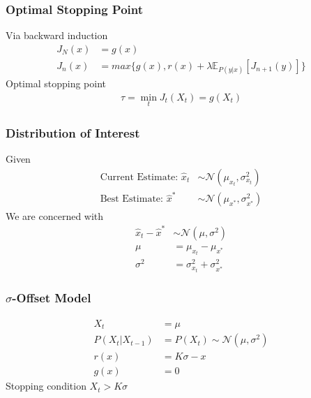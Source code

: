 \documentclass[compress, xcolor=pst]{beamer}
\begin{document}
\begin{frame}
	\frametitle{\textbf{Optimal Stopping Point}}
	Via backward induction
	\begin{align*}
	  J_N(x) &= g(x)\\
	  J_n(x) &= max\{g(x), r(x) + \lambda\mathbb{E}_{P(y\vert x)}[J_{n+1}(y)]\}
	\end{align*}
	Optimal stopping point
	\begin{align*}
	  \tau = \min_{t}J_t(X_t) = g(X_t)
	\end{align*}
\end{frame}

\begin{frame}
	\frametitle{\textbf{Distribution of Interest}}
	Given
	\begin{align*}
		\text{Current Estimate: } \hat{x}_t &\sim \mathcal{N}(\mu_{x_t}, \sigma^2_{x_t})\\
		\text{Best Estimate: } \hat{x}^* &\sim \mathcal{N}(\mu_{x^*}, \sigma^2_{x^*})
	\end{align*}
	We are concerned with
	\begin{align*}
	    \hat{x}_t - \hat{x}^* &\sim \mathcal{N}(\mu, \sigma^2)\\
	    \mu &= \mu_{x_t} - \mu_{x^*}\\
	    \sigma^2 &= \sigma^2_{x_t} + \sigma^2_{x^*}
	\end{align*}
\end{frame}

\begin{frame}
	\frametitle{\textbf{$\sigma$-Offset Model}}
	\begin{align*}
	  X_t &= \mu\\
	  P(X_t \vert X_{t-1}) &= P(X_t) \sim \mathcal{N}(\mu, \sigma^2)\\
	  r(x) &= K\sigma-x\\
	  g(x) &= 0
	\end{align*}
	Stopping condition $X_t > K\sigma$
\end{frame}
\end{document}
